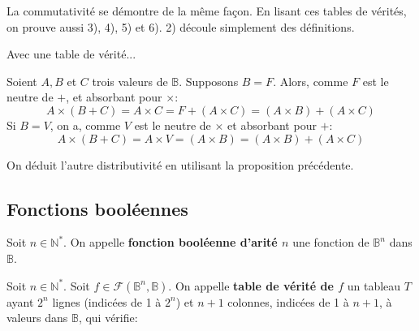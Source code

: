 \documentclass{scrartcl}
\begin{document}
			\begin{demo}
				\item La commutativité se démontre de la même façon. 
				En lisant ces tables de vérités, on prouve aussi 3), 4), 5) et 6). 2) découle simplement des définitions.
			\end{demo}
			
			\begin{demo}
				\item Avec une table de vérité...
			\end{demo}

			\begin{demo}
				\item Soient $A, B$ et $C$ trois valeurs de $\mathbb{B}$. Supposons $B = F$. Alors, comme $F$ est le neutre de $+$, et absorbant pour $\times$:
				\[ A \times (B+C) = A \times C =  F + (A \times C) = (A \times B) + (A \times C)\]
				Si $B = V$, on a, comme $V$ est le neutre de $\times$ et absorbant pour $+$:
				\[ A \times (B+C) = A \times V = (A \times B) = (A \times B) + (A \times C) \]
			\end{demo}
			\begin{demo}
				\item On déduit l'autre distributivité en utilisant la proposition précédente.
			\end{demo}

		\subsection{Fonctions booléennes}

			 Soit $n\in \mathbb{N}^*$. On appelle \textbf{fonction booléenne d'arité $n$} une fonction de $\mathbb{B}^n$ dans $\mathbb{B}$.


			 Soit $n \in \mathbb{N}^*$. Soit $f \in \mathcal{F}(\mathbb{B}^n,\mathbb{B})$. 
			On appelle \textbf{table de vérité de $f$} un tableau $T$ ayant $2^n$ lignes (indicées de 1 à $2^{n}$) et $n+1$ colonnes,
			indicées de 1 à $n+1$, à valeurs dans $\mathbb{B}$, qui vérifie:
\end{document}
